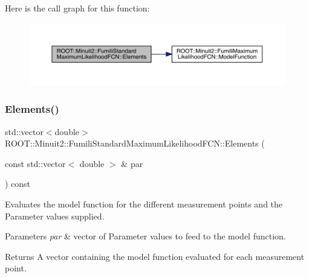 Here is the call graph for this function\+:\nopagebreak
\begin{figure}[H]
\begin{center}
\leavevmode
\includegraphics[width=350pt]{dd/d40/classROOT_1_1Minuit2_1_1FumiliStandardMaximumLikelihoodFCN_a19866fac44787dee8e2a6a35e7a15fe1_cgraph}
\end{center}
\end{figure}
\mbox{\label{classROOT_1_1Minuit2_1_1FumiliStandardMaximumLikelihoodFCN_af104474f9095c245b467f9db554a126a}} 
\subsubsection{\texorpdfstring{Elements()}{Elements()}\hspace{0.1cm}{\footnotesize\ttfamily [2/2]}}
{\footnotesize\ttfamily std\+::vector$<$double$>$ R\+O\+O\+T\+::\+Minuit2\+::\+Fumili\+Standard\+Maximum\+Likelihood\+F\+C\+N\+::\+Elements (\begin{DoxyParamCaption}\item[{const std\+::vector$<$ double $>$ \&}]{par }\end{DoxyParamCaption}) const\hspace{0.3cm}{\ttfamily [virtual]}}

Evaluates the model function for the different measurement points and the Parameter values supplied.


\begin{DoxyParams}{Parameters}
{\em par} & vector of Parameter values to feed to the model function.\\
\hline
\end{DoxyParams}
\begin{DoxyReturn}{Returns}
A vector containing the model function evaluated for each measurement point. 
\end{DoxyReturn}


